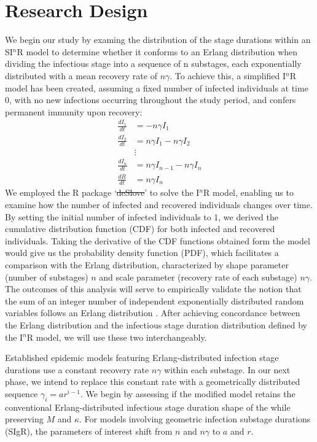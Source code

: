 \documentclass[12pt]{article}
\providecommand{\DIFadd}[1]{{\protect\color{blue}\uwave{#1}}} %
\providecommand{\DIFdel}[1]{{\protect\color{red}\sout{#1}}}                      %
\providecommand{\DIFaddbegin}{} %
\providecommand{\DIFaddend}{} %
\providecommand{\DIFdelbegin}{} %
\providecommand{\DIFdelend}{} %
\begin{document}
\section*{Research Design}
We begin our study by examing the distribution of the stage durations within an SI$^n$R model to determine whether it conforms to an Erlang distribution when dividing the infectious stage into a sequence of n substages, each exponentially distributed with a mean recovery rate of $n\gamma$. To achieve this, a simplified I$^n$R model has been created, assuming a fixed number of infected individuals at time 0, with no new infections occurring throughout the study period, and confers permanent immunity upon recovery:
\begin{align*}
    \frac{dI_1}{dt} &= -n \gamma I_1 \\
    \frac{dI_2}{dt} &= n \gamma I_1 - n \gamma I_2 \\
    &\vdots \\
    \frac{dI_n}{dt} &= n \gamma I_{n-1} - n \gamma I_n \\
    \frac{dR}{dt} &= n \gamma I_n 
\end{align*}
We employed the R package ‘\DIFdelbegin \DIFdel{deSlove}\DIFdelend \DIFaddbegin \DIFadd{deSolve}\DIFaddend ’ to solve the I$^n$R model, enabling us to examine how the number of infected and recovered individuals changes over time. By setting the initial number of infected individuals to 1, we derived the cumulative distribution function (CDF) for both infected and recovered individuals. Taking the derivative of the CDF functions obtained form the model would give us the probability density function (PDF), which facilitates a comparison with the Erlang distribution, characterized by shape parameter (number of substages) $n$ and scale parameter (recovery rate of each substage) $n\gamma$. The outcomes of this analysis will serve to empirically validate the notion that the sum of an integer number of independent exponentially distributed random variables follows an Erlang distribution \cite{Tummal2011}. After achieving concordance between the Erlang distribution and the infectious stage duration distribution defined by the I$^n$R model, we will use these two interchangeably.
\DIFdelbegin %
\DIFdelend \DIFaddbegin 

\DIFaddend Established epidemic models featuring Erlang-distributed infection stage durations use a constant recovery rate $n\gamma$ within each substage. In our next phase, we intend to replace this constant rate with a geometrically distributed sequence $\gamma_i = ar^{i-1}$. We begin by assessing if the modified model retains the conventional Erlang-distributed infectious stage duration shape of the while preserving $M$ and $\kappa$. For models involving geometric infection substage durations (SIgR), the parameters of interest shift from $n$ and $n\gamma$ to $a$ and $r$.
\DIFdelbegin %
\DIFdelend \DIFaddbegin 
\end{document}
